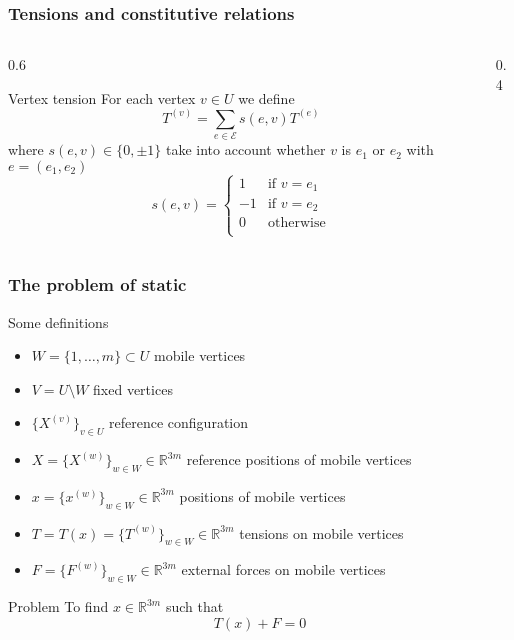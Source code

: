 \documentclass[10pt]{beamer}
\theoremstyle{definition}
\begin{document}
\begin{frame}
\frametitle{Tensions and constitutive relations}

\begin{columns}
\begin{column}{0.6\framewidth}
\begin{block}{Vertex tension}
For each vertex $v\in U$ we define
\[
T^{(v)}=\sum_{e\in\mathcal{E}}s(e,v)T^{(e)}
\]
where $s(e,v)\in\{0,\pm1\}$ take into account whether $v$ is $e_1$ or $e_2$ with $e=(e_1,e_2)$
\[
s(e,v)=
\begin{cases}
1 & \text{if $v=e_1$} \\
-1 & \text{if $v=e_2$} \\
0 & \text{otherwise} \\
\end{cases}
\]
\end{block}
\end{column}
\begin{column}{0.4\framewidth}
\begin{center}
\end{center}
\end{column}
\end{columns}

\end{frame}

\begin{frame}

\frametitle{The problem of static}

\begin{block}{Some definitions}
\begin{itemize}
\item $W=\{1,\dots,m\}\subset U$ mobile vertices
\item $V=U\setminus W$ fixed vertices
\item $\{X^{(v)}\}_{v\in U}$ reference configuration
\item $X=\{X^{(w)}\}_{w\in W}\in\mathbb{R}^{3m}$ reference positions of mobile vertices
\item $x=\{x^{(w)}\}_{w\in W}\in\mathbb{R}^{3m}$ positions of mobile vertices
\item $T=T(x)=\{T^{(w)}\}_{w\in W}\in\mathbb{R}^{3m}$ tensions on mobile vertices
\item $F=\{F^{(w)}\}_{w\in W}\in\mathbb{R}^{3m}$ external forces on mobile vertices
\end{itemize}
\end{block}

\begin{block}{Problem}
To find $x\in\mathbb{R}^{3m}$ such that
\[
T(x)+F=0
\]
\end{block}

\end{frame}
\end{document}

